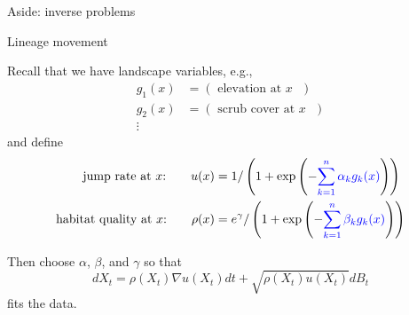 \documentclass{beamer}
\begin{document}
\begin{frame}{Aside: inverse problems}

\end{frame}

\begin{frame}{Lineage movement}

  Recall that we have {\newthing landscape variables}, e.g.,
  \begin{align*}
    g_1(x) &= ( \text{ elevation at $x$ } ) \\
    g_2(x) &= ( \text{ scrub cover at $x$ } ) \\
    \vdots
  \end{align*}
  and define
  \begin{align*}
    \text{jump rate at $x$:} \qquad u(x) &= 1/\left(1+\exp\left( - {\color{blue} \sum_{k=1}^n \alpha_k g_k(x) } \right) \right) \\
    \text{habitat quality at $x$:} \qquad \rho(x) &= e^\gamma / \left(1+\exp\left( - {\color{blue} \sum_{k=1}^n \beta_k g_k(x) } \right) \right)
  \end{align*}

  Then choose $\alpha$, $\beta$, and $\gamma$ so that
  \[
  dX_t = \rho(X_t) \nabla u(X_t) dt + \sqrt{\rho(X_t) u(X_t)} dB_t  
  \]
  fits the data.

\end{frame}
\end{document}

